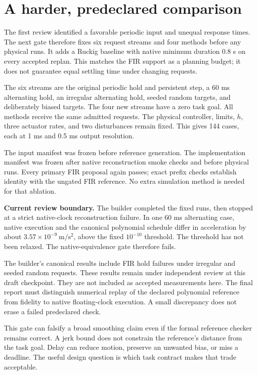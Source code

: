 \section{A harder, predeclared comparison}
The first review identified a favorable periodic input and unequal response times. The next gate therefore fixes six request streams and four methods before any physical runs. It adds a Ruckig baseline with native minimum duration $0.8$ s on every accepted replan. This matches the FIR support as a planning budget; it does not guarantee equal settling time under changing requests.

The six streams are the original periodic hold and persistent step, a 60 ms alternating hold, an irregular alternating hold, seeded random targets, and deliberately biased targets. The four new streams have a zero task goal. All methods receive the same admitted requests. The physical controller, limits, $h$, three actuator rates, and two disturbances remain fixed. This gives 144 cases, each at 1 ms and 0.5 ms output resolution.

The input manifest was frozen before reference generation. The implementation manifest was frozen after native reconstruction smoke checks and before physical runs. Every primary FIR proposal again passes; exact prefix checks establish identity with the ungated FIR reference. No extra simulation method is needed for that ablation.

\textbf{Current review boundary.} The builder completed the fixed runs, then stopped at a strict native-clock reconstruction failure. In one 60 ms alternating case, native execution and the canonical polynomial schedule differ in acceleration by about $3.57\times10^{-9}\ \mathrm{m/s^2}$, above the fixed $10^{-10}$ threshold. The threshold has not been relaxed. The native-equivalence gate therefore fails.

The builder's canonical results include FIR hold failures under irregular and seeded random requests. These results remain under independent review at this draft checkpoint. They are not included as accepted measurements here. The final report must distinguish numerical replay of the declared polynomial reference from fidelity to native floating-clock execution. A small discrepancy does not erase a failed predeclared check.

This gate can falsify a broad smoothing claim even if the formal reference checker remains correct. A jerk bound does not constrain the reference's distance from the task goal. Delay can reduce motion, preserve an unwanted bias, or miss a deadline. The useful design question is which task contract makes that trade acceptable.
